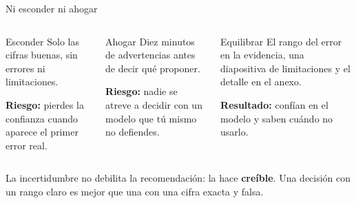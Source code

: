 \documentclass[aspectratio=169,11pt]{beamer}
\begin{document}
\begin{frame}[t]{Ni esconder ni ahogar}
  \begin{columns}[T,onlytextwidth]
    \begin{alertblock}{Esconder}
      \footnotesize Solo las cifras buenas, sin errores ni limitaciones.
      \vspace{3pt}

      \textbf{Riesgo:} pierdes la confianza cuando aparece el primer error
      real.
    \end{alertblock}
    \begin{alertblock}{Ahogar}
      \footnotesize Diez minutos de advertencias antes de decir qué
      proponer.
      \vspace{3pt}

      \textbf{Riesgo:} nadie se atreve a decidir con un modelo que tú mismo
      no defiendes.
    \end{alertblock}
    \begin{exampleblock}{Equilibrar}
      \footnotesize El rango del error en la evidencia, una diapositiva de
      limitaciones y el detalle en el anexo.
      \vspace{3pt}

      \textbf{Resultado:} confían en el modelo y saben cuándo no usarlo.
    \end{exampleblock}
  \end{columns}
  \vspace{0.2cm}
  \small La incertidumbre no debilita la recomendación: la hace
  \textbf{creíble}. Una decisión con un rango claro es mejor que una con
  una cifra exacta y falsa.
\end{frame}
\end{document}
